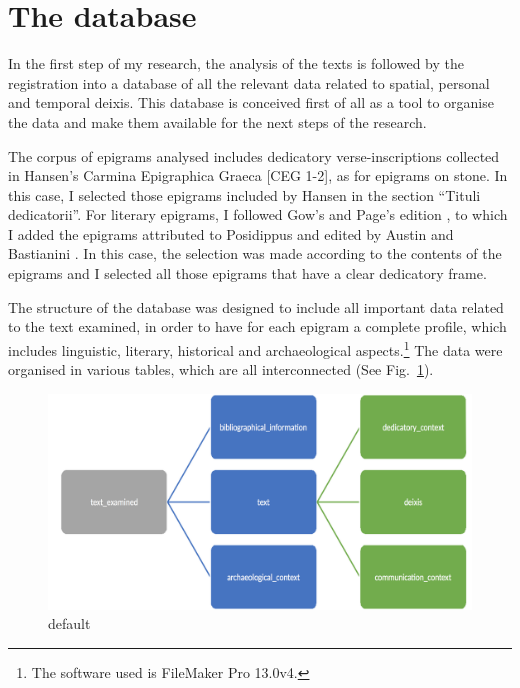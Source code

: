 \documentclass[amsthm,ebook]{saparticle}
\begin{document}
\section{The database}


\noindent In the first step of my research, the analysis of the texts is followed by the registration into a database of all the
relevant data related to spatial, personal and temporal deixis. This database is conceived first of all as a tool to
organise the data and make them available for the next steps of the research.

\vspace{5pt}
The corpus of epigrams analysed includes dedicatory verse-inscriptions collected in Hansen's Carmina Epigraphica Graeca
[CEG 1-2], as for epigrams on stone. In this case, I selected those epigrams included by Hansen in the section ``Tituli
dedicatorii''. For literary epigrams, I followed Gow's and Page's edition \citep{gow_greek_1965}, to which I added
the epigrams attributed to Posidippus and edited by Austin and Bastianini \citep{austin_posidippi_2002}. In this case, the
selection was made according to the contents of the epigrams and I selected all those epigrams that have a clear
dedicatory frame.

\vspace{5pt}
The structure of the database was designed to include all important data related to the text examined, in order to have
for each epigram a complete profile, which includes linguistic, literary, historical and archaeological
aspects.\footnote{ The software used is FileMaker Pro 13.0v4.} The data were organised in various tables, which are all interconnected (See Fig.~\ref{fig:1}). 

\begin{figure}[!hbp]
\centering
 \includegraphics[width=\columnwidth]{schema.png}
\caption{default}
\label{fig:1}
\end{figure}
\end{document}
